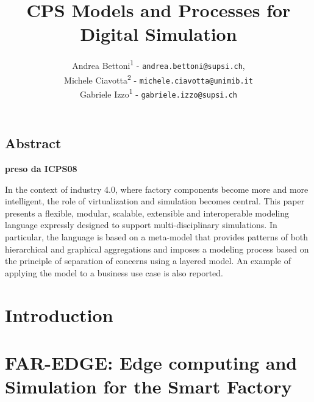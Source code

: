 \documentclass{riverk}
\begin{document}
\setcounter{article}{7}

\begin{opening}
\title[CPS Models and Processes for Digital Simulation]{CPS Models and Processes for Digital Simulation %
            }
\author{Andrea Bettoni\textsuperscript{1} - \texttt{andrea.bettoni@supsi.ch},\\
	Michele Ciavotta\textsuperscript{2} - \texttt{michele.ciavotta@unimib.it}\\
	Gabriele Izzo\textsuperscript{1} - \texttt{gabriele.izzo@supsi.ch}}
\end{opening}

\subsection*{Abstract}
\textbf{preso da ICPS08}

In the context of industry 4.0, where factory components become more and more intelligent, the role of virtualization and simulation becomes central. This paper presents a flexible, modular, scalable, extensible and interoperable modeling language expressly designed to support multi-disciplinary simulations. In particular, the language is based on a meta-model that provides patterns of both hierarchical and graphical aggregations and imposes a modeling process based on the principle of separation of concerns using a layered model. An example of applying the model to a business use case is also reported. 


\section{Introduction} 


\section{FAR-EDGE: Edge computing and Simulation for the Smart Factory}

\end{document}
